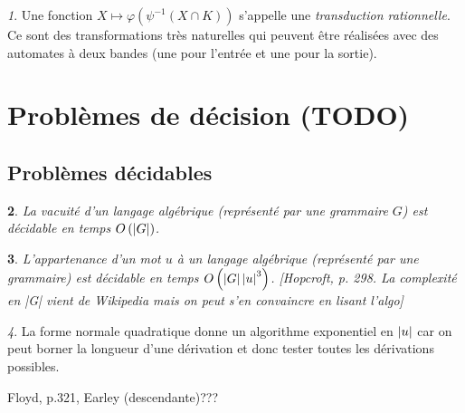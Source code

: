 \documentclass[10pt,a4paper,notitlepage]{article}
\theoremstyle{plain}
\newtheorem{thm}{\protect\theoremname}
\theoremstyle{definition}
\newtheorem{defn}[thm]{\protect\definitionname}
\theoremstyle{definition}
\theoremstyle{remark}
\theoremstyle{remark}
\newtheorem{rem}[thm]{\protect\remarkname}
\theoremstyle{plain}
\theoremstyle{plain}
\theoremstyle{plain}
\theoremstyle{remark}
\providecommand{\definitionname}{Définition}
\providecommand{\remarkname}{Remarque}
\providecommand{\theoremname}{Théorème}
\begin{document}
\begin{rem}
	Une fonction $X\mapsto\varphi\left(\psi^{-1}\left(X\cap K\right)\right)$
	s'appelle une \emph{transduction rationnelle}. Ce sont des transformations
	très naturelles qui peuvent être réalisées avec des automates à deux
	bandes (une pour l'entrée et une pour la sortie).
\end{rem}

%





\section{Problèmes de décision (TODO)}

\subsection{Problèmes décidables}
\begin{thm}
	La vacuité d'un langage algébrique (représenté par une grammaire $G$)
	est décidable en temps $O\left(\left|G\right|\right)$.
\end{thm}

\begin{thm}
	L'appartenance d'un mot $u$ à un langage algébrique (représenté par
	une grammaire) est décidable en temps $O\left(\left|G\right|\left|u\right|^{3}\right)$.
	{[}Hopcroft, p. 298. La complexité en |G| vient de Wikipedia mais
	on peut s'en convaincre en lisant l'algo{]}\end{thm}
\begin{rem}
	La forme normale quadratique donne un algorithme exponentiel en $\left|u\right|$
	car on peut borner la longueur d'une dérivation et donc tester toutes
	les dérivations possibles.\\
	
\end{rem}
Floyd, p.321, Earley (descendante)???
\end{document}
